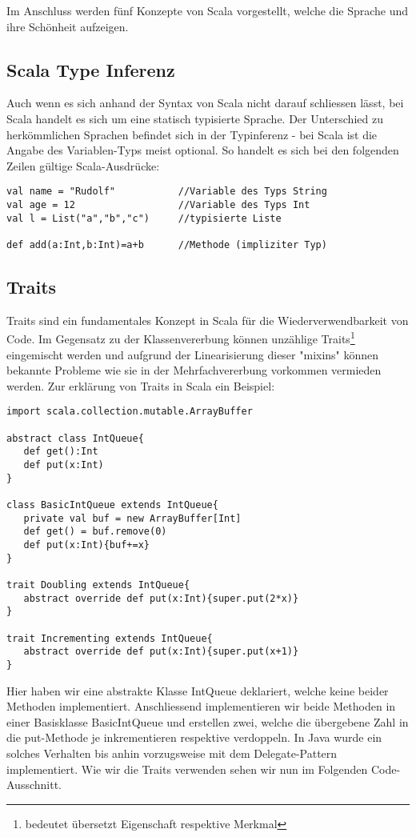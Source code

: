 Im Anschluss werden f\"unf Konzepte von Scala vorgestellt, welche die Sprache und ihre Sch\"onheit aufzeigen.

\subsection{Scala Type Inferenz}
Auch wenn es sich anhand der Syntax von Scala nicht darauf schliessen l\"asst, bei Scala handelt es sich um eine statisch typisierte Sprache. Der Unterschied zu herk\"ommlichen Sprachen befindet sich in der Typinferenz - bei Scala ist die Angabe des Variablen-Typs meist optional. So handelt es sich bei den folgenden Zeilen g\"ultige Scala-Ausdr\"ucke:

\begin{lstlisting}[caption=Typeinferenz in Scala]
val name = "Rudolf"           //Variable des Typs String
val age = 12                  //Variable des Typs Int
val l = List("a","b","c")     //typisierte Liste

def add(a:Int,b:Int)=a+b      //Methode (impliziter Typ)
\end{lstlisting}
\subsection{Traits}
Traits sind ein fundamentales Konzept in Scala für die Wiederverwendbarkeit von Code. Im Gegensatz zu der Klassenvererbung können unzählige Traits\footnote{bedeutet \"ubersetzt Eigenschaft respektive Merkmal} eingemischt werden und aufgrund der Linearisierung dieser "mixins" können bekannte Probleme wie sie in der Mehrfachvererbung vorkommen vermieden werden. Zur erkl\"arung von Traits in Scala ein Beispiel\cite[p. 222-227]{odersky2008programming}:

\begin{lstlisting}[caption=Klassen und Traits definieren]
import scala.collection.mutable.ArrayBuffer

abstract class IntQueue{
   def get():Int
   def put(x:Int)
}

class BasicIntQueue extends IntQueue{
   private val buf = new ArrayBuffer[Int]
   def get() = buf.remove(0)
   def put(x:Int){buf+=x}
}

trait Doubling extends IntQueue{
   abstract override def put(x:Int){super.put(2*x)}
}

trait Incrementing extends IntQueue{
   abstract override def put(x:Int){super.put(x+1)}
}
\end{lstlisting}
Hier haben wir eine abstrakte Klasse IntQueue deklariert, welche keine beider Methoden implementiert. Anschliessend implementieren wir beide Methoden in einer Basisklasse BasicIntQueue und erstellen zwei, welche die \"ubergebene Zahl in die put-Methode je inkrementieren respektive verdoppeln. In Java wurde ein solches Verhalten bis anhin vorzugsweise mit dem Delegate-Pattern implementiert.
Wie wir die Traits verwenden sehen wir nun im Folgenden Code-Ausschnitt. 


